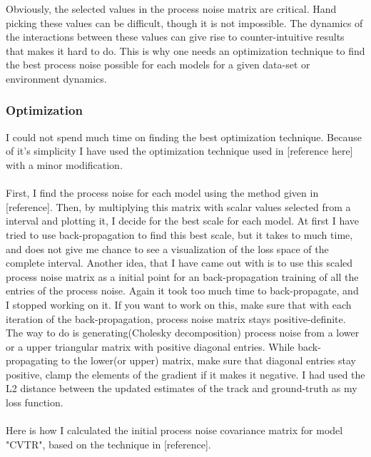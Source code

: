 \documentclass[peerreview]{IEEEtran}
\begin{document}
Obviously, the selected values in the process noise matrix are critical. Hand picking these values can be difficult, though it is not impossible. The dynamics of the interactions between these values can give rise to counter-intuitive results that makes it hard to do. This is why one needs an optimization technique to find the best process noise possible for each models for a given data-set or environment dynamics.

\vspace{10px}

\subsubsection{Optimization}
I could not spend much time on finding the best optimization technique. Because of it's simplicity I have used the optimization technique used in [reference here] with a minor modification. \\ \\

First, I find the process noise for each model using the method given in [reference]. Then, by multiplying this matrix with scalar values selected from a interval and plotting it, I decide for the best scale for each model. At first I have tried to use back-propagation to find this best scale, but it takes to much time, and does not give me chance to see a visualization of the loss space of the complete interval. Another idea, that I have came out with is to use this scaled process noise matrix as a initial point for an back-propagation training of all the entries of the process noise. Again it took too much time to back-propagate, and I stopped working on it. If you want to work on this, make sure that with each iteration of the back-propagation, process noise matrix stays positive-definite. The way to do is generating(Cholesky decomposition) process noise from a lower or a upper triangular matrix with positive diagonal entries. While back-propagating to the lower(or upper) matrix, make sure that diagonal entries stay positive, clamp the elements of the gradient if it makes it negative. I had used the L2 distance between the updated estimates of the track and ground-truth as my loss function. \\ \\

Here is how I calculated the initial process noise covariance matrix for model "CVTR", based on the technique in [reference]. \\
\end{document}
